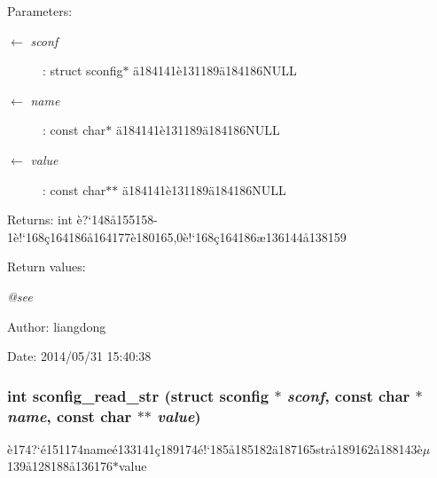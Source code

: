 \begin{Desc}
\item[Parameters:]
\begin{description}
\item[\mbox{$\leftarrow$} {\em sconf}]: struct sconfig$\ast$ \"{a}184141\`{e}131189\"{a}184186NULL \item[\mbox{$\leftarrow$} {\em name}]: const char$\ast$ \"{a}184141\`{e}131189\"{a}184186NULL \item[\mbox{$\leftarrow$} {\em value}]: const char$\ast$$\ast$ \"{a}184141\`{e}131189\"{a}184186NULL \end{description}
\end{Desc}
\begin{Desc}
\item[Returns:]int \`{e}?`148\aa{}155158-1\`{e}!`168\c{c}164186\aa{}164177\`{e}180165,0\`{e}!`168\c{c}164186\ae{}136144\aa{}138159 \end{Desc}
\begin{Desc}
\item[Return values:]
\begin{description}
\item[{\em @see}]\end{description}
\end{Desc}
\begin{Desc}
\item[Author:]liangdong \end{Desc}
\begin{Desc}
\item[Date:]2014/05/31 15:40:38 \end{Desc}
\subsubsection{\setlength{\rightskip}{0pt plus 5cm}int sconfig\_\-read\_\-str (struct sconfig $\ast$ {\em sconf}, const char $\ast$ {\em name}, const char $\ast$$\ast$ {\em value})}\label{sconfig_8h_a3}


\`{e}174?`\'{e}151174name\'{e}133141\c{c}189174\'{e}!`185\aa{}185182\"{a}187165str\aa{}189162\aa{}188143\`{e}$\mu$139\aa{}128188\aa{}136176$\ast$value 

